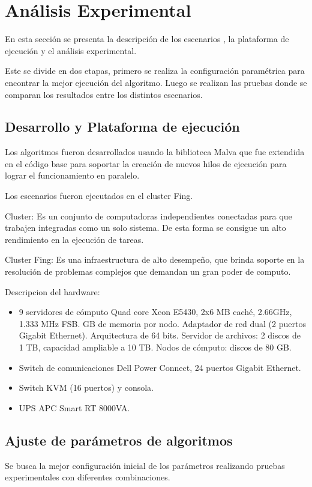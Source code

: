 \chapter{Análisis Experimental}
En esta sección se presenta la descripción de los escenarios , la plataforma de ejecución y el análisis experimental.

Este se divide en dos etapas, primero se realiza la configuración paramétrica para encontrar la mejor ejecución del algoritmo. Luego se realizan las pruebas donde se comparan los resultados entre los distintos escenarios.


\section{Desarrollo y Plataforma de ejecución }
Los algoritmos fueron desarrollados usando la biblioteca Malva que fue extendida en el código base para soportar la creación de nuevos hilos de ejecución para lograr el funcionamiento en paralelo.

Los escenarios fueron ejecutados en el cluster Fing.

Cluster: Es un conjunto de computadoras independientes conectadas para que trabajen integradas como un solo sistema. De esta forma se consigue un alto rendimiento en la ejecución de tareas. 

Cluster Fing: Es una infraestructura de alto desempeño, que brinda soporte en la resolución de problemas complejos que demandan un gran poder de computo.

Descripcion del hardware: 
\begin{itemize}
	\item 9 servidores de cómputo
	\subitem Quad core Xeon E5430, 2x6 MB caché, 2.66GHz, 1.333 MHz FSB.
	 GB de memoria por nodo.
	\subitem Adaptador de red dual (2 puertos Gigabit Ethernet).
	\subitem  Arquitectura de 64 bits.
	\subitem Servidor de archivos: 2 discos de 1 TB, capacidad ampliable a 10 TB.
	\subitem Nodos de cómputo: discos de 80 GB.
	\item Switch de comunicaciones
	\subitem Dell Power Connect, 24 puertos Gigabit Ethernet.
	\item Switch KVM (16 puertos) y consola.
	\item UPS APC Smart RT 8000VA.
\end{itemize}

\section{Ajuste de parámetros de algoritmos}
Se busca la mejor configuración inicial de los parámetros realizando pruebas experimentales con diferentes combinaciones.  

